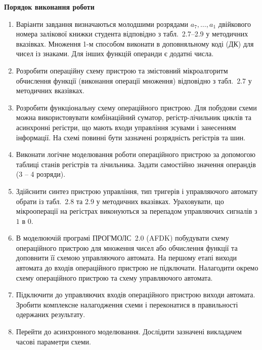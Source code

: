 \documentclass[12pt,a4paper]{article}
\begin{document}
    \begin{center} \textbf{\large Порядок виконання роботи} \end{center}

    \begin{enumerate}
        \item Варіанти завдання визначаються молодшими розрядами $a_7,\ldots,a_1$ двійкового номера залікової книжки студента відповідно з табл.~2.7--2.9 у методичних вказівках. Множення 1-м способом виконати в доповняльному коді (ДК) для чисел із знаками. Для інших функцій операнди є додатні числа.

        \item Розробити операційну схему пристрою та змістовний мікроалгоритм обчислення функції (виконання операції множення) відповідно з табл.~2.7 у методичних вказівках.

        \item Розробити функціональну схему операційного пристрою. Для побудови схеми можна використовувати комбінаційний суматор, регістр-лічильник циклів та асинхронні регістри, що мають входи управління зсувами і занесенням інформації. На схемі повинні бути зазначені розрядність регістрів та шин.

        \item Виконати логічне моделювання роботи операційного пристрою за допомогою таблиці станів регістрів та лічильника. Задати самостійно значення операндів (3 -- 4 розряди).

        \item Здійснити синтез пристрою управління, тип тригерів і управляючого автомату обрати із табл.~2.8 та 2.9 у методичних вказівках. Ураховувати, що мікрооперації на регістрах виконуються за перепадом управляючих сигналів з $1$ в $0$.
    
        \item В моделюючій програмі ПРОГМОЛС~2.0 (AFDK) побудувати схему операційного пристрою для множення чисел або обчислення функції та доповнити її схемою управляючого автомата. На першому етапі виходи автомата до входів операційного пристрою не підключати. Налагодити окремо схему операційного пристрою та схему управляючого автомата.

        \item Підключити до управляючих входів операційного пристрою виходи автомата. Зробити комплексне налагодження схеми і переконатися в правильності одержаних результату.

        \item Перейти до асинхронного моделювання. Дослідити зазначені викладачем часові параметри схеми.

    \end{enumerate}
\end{document}
